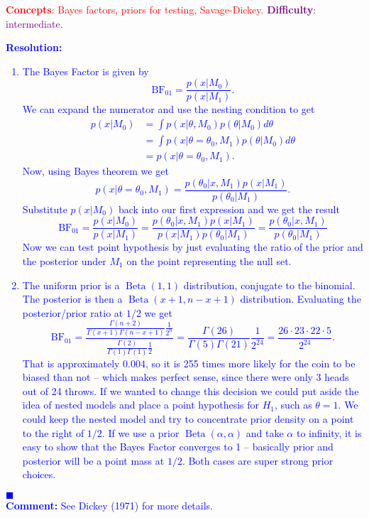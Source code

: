 \textcolor{red}{\textbf{Concepts}: Bayes factors, priors for testing, Savage-Dickey.}
\textcolor{purple}{\textbf{Difficulty}: intermediate.}\\
\textcolor{blue}{
\textbf{Resolution:}
\begin{enumerate}[label = \alph*)]
    \item The Bayes Factor is given by
    \begin{equation*}
        \operatorname{BF_{01}} = \frac{p(x|M_0)}{p(x|M_1)}.
    \end{equation*}
    We can expand the numerator and use the nesting condition to get
    \begin{align*}
        p(x|M_0) &= \int p(x|\theta, M_0)p(\theta|M_0)d\theta \\
        &= \int p(x|\theta = \theta_0, M_1)p(\theta|M_0)d\theta \\
        &= p(x| \theta = \theta_0, M_1).
    \end{align*}
    Now, using Bayes theorem we get
    \begin{equation*}
        p(x| \theta = \theta_0, M_1) = \frac{p(\theta_0 | x, M_1) p(x|M_1)}{p(\theta_0|M_1)}.
    \end{equation*}
    Substitute $p(x|M_0)$ back into our first expression and we get the result
    \begin{equation*}
        \operatorname{BF_{01}} = \frac{p(x|M_0)}{p(x|M_1)} = \frac{p(\theta_0 | x, M_1) p(x|M_1)}{p(x|M_1)p(\theta_0|M_1)} = \frac{p(\theta_0 | x, M_1)}{p(\theta_0|M_1)}
    \end{equation*}
    Now we can test point hypothesis by just evaluating the ratio of the prior and the posterior under $M_1$ on the point representing the null set.
    \item The uniform prior is a $\operatorname{Beta}(1,1)$ distribution, conjugate to the binomial. The posterior is then a $\operatorname{Beta}(x+1,n-x+1)$ distribution. Evaluating the posterior/prior ratio at $1/2$ we get
    \begin{equation*}
        \operatorname{BF_{01}} = \frac{\frac{\Gamma(n+2)}{\Gamma(x+1)\Gamma(n-x+1)}\frac{1}{2^{n}}}{\frac{\Gamma(2)}{\Gamma(1)\Gamma(1)} \frac{1}{2}} = \frac{\Gamma(26)}{\Gamma(5)\Gamma(21)} \frac{1}{2^{24}} = \frac{26 \cdot 23 \cdot 22 \cdot 5}{2^{24}}.
    \end{equation*}
    That is approximately $0.004$, so it is 255 times more likely for the coin to be biased than not -- which makes perfect sense, since there were only 3 heads out of 24 throws.
    If we wanted to change this decision we could put aside the idea of nested models and place a point hypothesis for $H_1$, such as $\theta = 1$.
    We could keep the nested model and try to concentrate prior density on a point to the right of $1/2$.
    If we use a prior $\operatorname{Beta}(\alpha, \alpha)$ and take $\alpha$ to infinity, it is easy to show that the Bayes Factor converges to 1 -- basically prior and posterior will be a point mass at $1/2$.
    Both cases are super strong prior choices. 
\end{enumerate}
$\blacksquare$\\
\textbf{Comment:} See Dickey (1971) for more details.
}